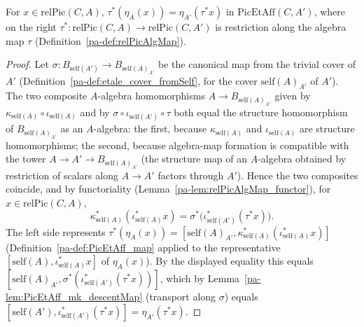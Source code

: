 \begin{theorem}
  \label{pa-thm:PicEtAff_map_unit}
  \leanok

  For \(x \in \mathrm{relPic}(C,A)\), \(\tau^{*}(\eta_A(x)) = \eta_{A'}(\tau^{*}x)\) in
  \(\mathrm{PicEtAff}(C,A')\), where on the right \(\tau^{*} \colon \mathrm{relPic}(C,A) \to
  \mathrm{relPic}(C,A')\) is restriction along the algebra map \(\tau\)
  (Definition~\ref{pa-def:relPicAlgMap}).
\end{theorem}
\begin{proof}
  \leanok
  Let \(\sigma \colon B_{\mathrm{self}(A')} \to B_{\mathrm{self}(A)_{A'}}\) be the canonical map
  from the trivial cover of \(A'\) (Definition~\ref{pa-def:etale_cover_fromSelf}, for the cover
  \(\mathrm{self}(A)_{A'}\) of \(A'\)). The two composite \(A\)-algebra homomorphisms
  \(A \to B_{\mathrm{self}(A)_{A'}}\) given by \(\kappa_{\mathrm{self}(A)} \circ \iota_{
  \mathrm{self}(A)}\) and by \(\sigma \circ \iota_{\mathrm{self}(A')} \circ \tau\) both equal
  the structure homomorphism of \(B_{\mathrm{self}(A)_{A'}}\) as an \(A\)-algebra: the first,
  because \(\kappa_{\mathrm{self}(A)}\) and \(\iota_{\mathrm{self}(A)}\) are structure
  homomorphisms; the second, because algebra-map formation is compatible with the tower
  \(A \to A' \to B_{\mathrm{self}(A)_{A'}}\) (the structure map of an \(A\)-algebra obtained by
  restriction of scalars along \(A \to A'\) factors through \(A'\)). Hence the two composites
  coincide, and by functoriality (Lemma~\ref{pa-lem:relPicAlgMap_functor}), for \(x \in
  \mathrm{relPic}(C,A)\),
  \[
    \kappa_{\mathrm{self}(A)}^{*}(\iota_{\mathrm{self}(A)}^{*}x) = \sigma^{*}\bigl(
    \iota_{\mathrm{self}(A')}^{*}(\tau^{*}x)\bigr).
  \]
  The left side represents \(\tau^{*}(\eta_A(x)) = [\mathrm{self}(A)_{A'},
  \kappa_{\mathrm{self}(A)}^{*}(\iota_{\mathrm{self}(A)}^{*}x)]\)
  (Definition~\ref{pa-def:PicEtAff_map} applied to the representative \([\mathrm{self}(A),
  \iota_{\mathrm{self}(A)}^{*}x]\) of \(\eta_A(x)\)). By the displayed equality this equals
  \([\mathrm{self}(A)_{A'}, \sigma^{*}(\iota_{\mathrm{self}(A')}^{*}(\tau^{*}x))]\), which by
  Lemma~\ref{pa-lem:PicEtAff_mk_descentMap} (transport along \(\sigma\)) equals
  \([\mathrm{self}(A'), \iota_{\mathrm{self}(A')}^{*}(\tau^{*}x)] = \eta_{A'}(\tau^{*}x)\).
\end{proof}

